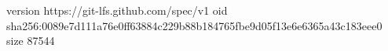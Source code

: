 version https://git-lfs.github.com/spec/v1
oid sha256:0089e7d111a76e0ff63884c229b88b184765fbe9d05f13e6e6365a43c183eee0
size 87544
